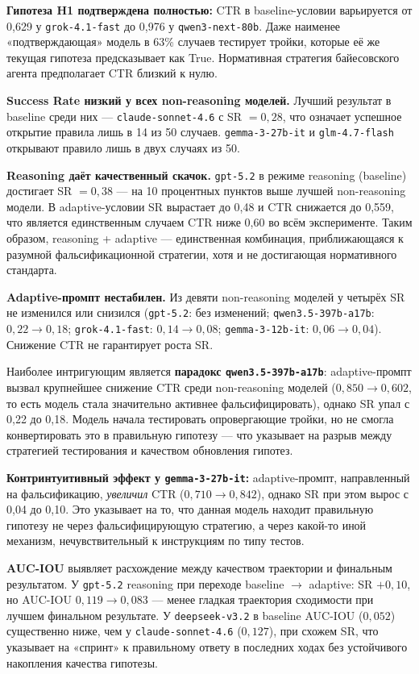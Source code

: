 \textbf{Гипотеза H1 подтверждена полностью:} CTR в baseline-условии варьируется от 0,629 у \texttt{grok-4.1-fast} до 0,976 у \texttt{qwen3-next-80b}. Даже наименее «подтверждающая» модель в 63\% случаев тестирует тройки, которые её же текущая гипотеза предсказывает как True. Нормативная стратегия байесовского агента предполагает CTR близкий к нулю.

\textbf{Success Rate низкий у всех non-reasoning моделей.} Лучший результат в baseline среди них --- \texttt{claude-sonnet-4.6} с SR $= 0{,}28$, что означает успешное открытие правила лишь в 14 из 50 случаев. \texttt{gemma-3-27b-it} и \texttt{glm-4.7-flash} открывают правило лишь в двух случаях из 50.

\textbf{Reasoning даёт качественный скачок.} \texttt{gpt-5.2} в режиме reasoning (baseline) достигает SR $= 0{,}38$ --- на 10 процентных пунктов выше лучшей non-reasoning модели. В adaptive-условии SR вырастает до 0{,}48 и CTR снижается до 0{,}559, что является единственным случаем CTR ниже 0{,}60 во всём эксперименте. Таким образом, reasoning + adaptive --- единственная комбинация, приближающаяся к разумной фальсификационной стратегии, хотя и не достигающая нормативного стандарта.

\textbf{Adaptive-промпт нестабилен.} Из девяти non-reasoning моделей у четырёх SR не изменился или снизился (\texttt{gpt-5.2}: без изменений; \texttt{qwen3.5-397b-a17b}: $0{,}22 \to 0{,}18$; \texttt{grok-4.1-fast}: $0{,}14 \to 0{,}08$; \texttt{gemma-3-12b-it}: $0{,}06 \to 0{,}04$). Снижение CTR не гарантирует роста SR.

Наиболее интригующим является \textbf{парадокс \texttt{qwen3.5-397b-a17b}}: adaptive-промпт вызвал крупнейшее снижение CTR среди non-reasoning моделей ($0{,}850 \to 0{,}602$, то есть модель стала значительно активнее фальсифицировать), однако SR упал с 0{,}22 до 0{,}18. Модель начала тестировать опровергающие тройки, но не смогла конвертировать это в правильную гипотезу --- что указывает на разрыв между стратегией тестирования и качеством обновления гипотез.

\textbf{Контринтуитивный эффект у \texttt{gemma-3-27b-it}:} adaptive-промпт, направленный на фальсификацию, \textit{увеличил} CTR ($0{,}710 \to 0{,}842$), однако SR при этом вырос с 0{,}04 до 0{,}10. Это указывает на то, что данная модель находит правильную гипотезу не через фальсифицирующую стратегию, а через какой-то иной механизм, нечувствительный к инструкциям по типу тестов.

\textbf{AUC-IOU} выявляет расхождение между качеством траектории и финальным результатом. У \texttt{gpt-5.2} reasoning при переходе baseline $\to$ adaptive: SR $+0{,}10$, но AUC-IOU $0{,}119 \to 0{,}083$ --- менее гладкая траектория сходимости при лучшем финальном результате. У \texttt{deepseek-v3.2} в baseline AUC-IOU ($0{,}052$) существенно ниже, чем у \texttt{claude-sonnet-4.6} ($0{,}127$), при схожем SR, что указывает на «спринт» к правильному ответу в последних ходах без устойчивого накопления качества гипотезы.

